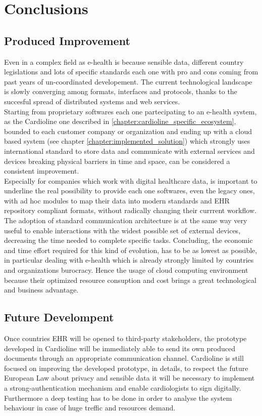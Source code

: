 \chapter{Conclusions}
\section{Produced Improvement}
Even in a complex field as e-health is because sensible data, different country legislations and lots of specific standards each one with pro and cons coming from past years of un-coordinated developement. The current technological landscape is slowly converging among formats, interfaces and protocols, thanks to the succesful spread of distributed systems and web services.\\
Starting from proprietary softwares each one partecipating to an e-health system, as the Cardioline one described in \ref{chapter:cardioline_specific_ecosystem}, bounded to each customer company or organization and ending up with a cloud based system (see chapter \ref{chapter:implemented_solution}) which strongly uses international standard to store data and communicate with external services and devices breaking physical barriers in time and space, can be considered a consistent improvement.\\
Especially for companies which work with digital healthcare data, is important to underline the real possibility to provide each one softwares, even the legacy ones, with ad hoc modules to map their data into modern standards and EHR repository compliant formats, without radically changing their currrent workflow.
The adoption of standard communication architecture is at the same way very useful to enable interactions with the widest possible set of external devices, decreasing the time needed to complete specific tasks.
Concluding, the economic and time effort required for this kind of evolution, has to be as lowest as possible, in particular dealing with e-health which is already strongly limited by countries and organizations burocracy. Hence the usage of cloud computing environment because their optimized resource consuption and cost brings a great technological and business advantage.

\section{Future Develompent}
Once countries EHR will be opened to third-party stakeholders, the prototype developed in Cardioline will be immediately able to send its own produced documents through an appropriate communication channel.
Cardioline is still focused on improving the developed prototype, in details, to respect the future European Law about privacy and sensible data it will be necessary to implement a strong-authentication mechanism and enable cardiologists to sign digitally.\\
Furthermore a deep testing has to be done in order to analyse the system behaviour in case of huge treffic and resources demand.